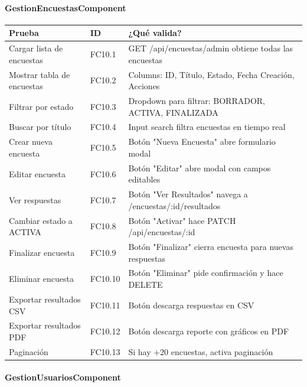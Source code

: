 \paragraph{GestionEncuestasComponent}

\begin{table}[H]
\centering
\begin{tabular}{|l|l|p{6cm}|}
\hline
\textbf{Prueba} & \textbf{ID} & \textbf{¿Qué valida?} \\ \hline
Cargar lista de encuestas & FC10.1 & GET /api/encuestas/admin obtiene todas las encuestas \\ \hline
Mostrar tabla de encuestas & FC10.2 & Columns: ID, Título, Estado, Fecha Creación, Acciones \\ \hline
Filtrar por estado & FC10.3 & Dropdown para filtrar: BORRADOR, ACTIVA, FINALIZADA \\ \hline
Buscar por título & FC10.4 & Input search filtra encuestas en tiempo real \\ \hline
Crear nueva encuesta & FC10.5 & Botón "Nueva Encuesta" abre formulario modal \\ \hline
Editar encuesta & FC10.6 & Botón "Editar" abre modal con campos editables \\ \hline
Ver respuestas & FC10.7 & Botón "Ver Resultados" navega a /encuestas/:id/resultados \\ \hline
Cambiar estado a ACTIVA & FC10.8 & Botón "Activar" hace PATCH /api/encuestas/:id \\ \hline
Finalizar encuesta & FC10.9 & Botón "Finalizar" cierra encuesta para nuevas respuestas \\ \hline
Eliminar encuesta & FC10.10 & Botón "Eliminar" pide confirmación y hace DELETE \\ \hline
Exportar resultados CSV & FC10.11 & Botón descarga respuestas en CSV \\ \hline
Exportar resultados PDF & FC10.12 & Botón descarga reporte con gráficos en PDF \\ \hline
Paginación & FC10.13 & Si hay +20 encuestas, activa paginación \\ \hline
\end{tabular}
\end{table}

\paragraph{GestionUsuariosComponent}

